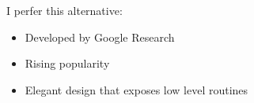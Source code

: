 \begin{frame}

    I perfer this alternative:

            \vspace{0.5em}

    \begin{figure}
       \centering
    \end{figure}
    
            \vspace{0.5em}

    \begin{itemize}
        \item Developed by Google Research
            \vspace{0.5em}
        \item Rising popularity
            \vspace{0.5em}
        \item Elegant design that exposes low level routines
    \end{itemize}

\end{frame}


